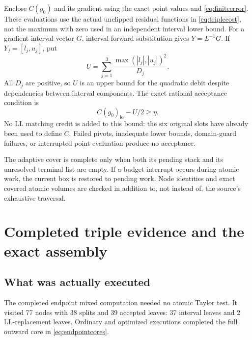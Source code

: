 \documentclass[11pt]{amsart}
\numberwithin{equation}{section}
\newcommand{\lo}{\mathrm{lo}}
\begin{document}
Enclose $C(g_0)$ and its gradient using the exact point values
and \eqref{eq:finiteerror}. These evaluations use the actual
unclipped residual functions in \eqref{eq:triplecost}, not the
maximum with zero used in an independent interval lower bound.
For a gradient interval vector $G$, interval forward substitution
gives $Y=L^{-1}G$. If $Y_j=[l_j,u_j]$, put
\begin{equation}\label{eq:atomicU}
 U=\sum_{j=1}^3\frac{\max(|l_j|,|u_j|)^2}{D_j}.
\end{equation}
All $D_j$ are positive, so $U$ is an upper bound for the
quadratic debit despite dependencies between interval components.
The exact rational acceptance condition is
\begin{equation}\label{eq:atomicaccept}
 C(g_0)_{\lo}-U/2\geq\eta.
\end{equation}
No LL matching credit is added to this bound: the six original
slots have already been used to define $C$. Failed pivots,
inadequate lower bounds, domain-guard failures, or interrupted
point evaluation produce no acceptance.

The adaptive cover is complete only when both its pending stack
and its unresolved terminal list are empty. If a budget interrupt
occurs during atomic work, the current box is restored to pending
work. Node identities and exact covered atomic volumes are checked
in addition to, not instead of, the source's exhaustive traversal.

\section{Completed triple evidence and the exact assembly}

\subsection{What was actually executed}

The completed endpoint mixed computation needed no atomic Taylor
test. It visited 77 nodes with 38 splits and 39 accepted leaves:
37 interval leaves and 2 LL-replacement leaves. Ordinary and
optimized executions completed the full outward core in
\eqref{eq:endpointcores}.
\end{document}
